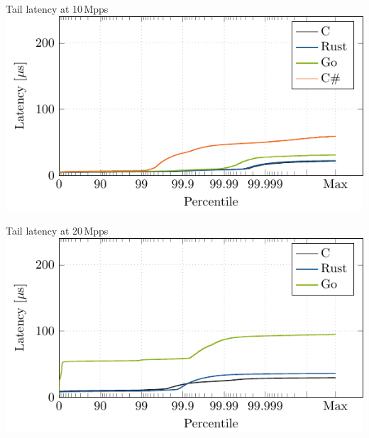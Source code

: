 \documentclass[NET,english,aspectratio=169,notitleframe]{tumbeamer}
\begin{document}
\begin{frame}{Tail latency at 10\,Mpps}
\centering\includegraphics[scale=1.1]{figures/latency-10/latency-ccdf.pdf}
\end{frame}

\begin{frame}{Tail latency at 20\,Mpps}
\centering\includegraphics[scale=1.1]{figures/latency-20/latency-ccdf.pdf}
\end{frame}
\end{document}
